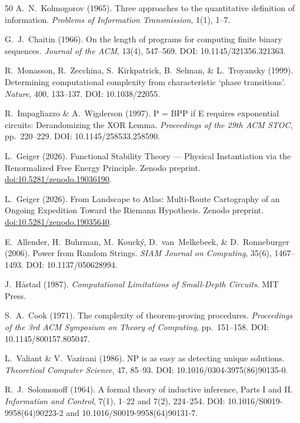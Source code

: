 \documentclass[aps,prd,twocolumn,superscriptaddress,nofootinbib]{revtex4-2}
\theoremstyle{definition}
\theoremstyle{remark}
\begin{document}
\begin{thebibliography}{50}
A.~N.~Kolmogorov (1965).
Three approaches to the quantitative definition of information.
\textit{Problems of Information Transmission}, 1(1), 1--7.

G.~J.~Chaitin (1966).
On the length of programs for computing finite binary sequences.
\textit{Journal of the ACM}, 13(4), 547--569.
DOI: 10.1145/321356.321363.

R.~Monasson, R.~Zecchina, S.~Kirkpatrick, B.~Selman, \& L.~Troyansky (1999).
Determining computational complexity from characteristic `phase transitions'.
\textit{Nature}, 400, 133--137.
DOI: 10.1038/22055.

R.~Impagliazzo \& A.~Wigderson (1997).
P = BPP if E requires exponential circuits: Derandomizing the XOR Lemma.
\textit{Proceedings of the 29th ACM STOC}, pp.\ 220--229.
DOI: 10.1145/258533.258590.

L.~Geiger (2026).
Functional Stability Theory --- Physical Instantiation via the Renormalized Free Energy Principle.
Zenodo preprint.
\href{https://doi.org/10.5281/zenodo.19036190}{doi:10.5281/zenodo.19036190}.

L.~Geiger (2026).
From Landscape to Atlas: Multi-Route Cartography of an Ongoing Expedition Toward the Riemann Hypothesis.
Zenodo preprint.
\href{https://doi.org/10.5281/zenodo.19035640}{doi:10.5281/zenodo.19035640}.

E.~Allender, H.~Buhrman, M.~Kouck\'y, D.~van~Melkebeek, \& D.~Ronneburger (2006).
Power from Random Strings.
\textit{SIAM Journal on Computing}, 35(6), 1467--1493.
DOI: 10.1137/050628994.

J.~H\r{a}stad (1987).
\textit{Computational Limitations of Small-Depth Circuits}.
MIT Press.

S.~A.~Cook (1971).
The complexity of theorem-proving procedures.
\textit{Proceedings of the 3rd ACM Symposium on Theory of Computing}, pp.\ 151--158.
DOI: 10.1145/800157.805047.

L.~Valiant \& V.~Vazirani (1986).
NP is as easy as detecting unique solutions.
\textit{Theoretical Computer Science}, 47, 85--93.
DOI: 10.1016/0304-3975(86)90135-0.

R.~J.~Solomonoff (1964).
A formal theory of inductive inference, Parts I and II.
\textit{Information and Control}, 7(1), 1--22 and 7(2), 224--254.
DOI: 10.1016/S0019-9958(64)90223-2 and 10.1016/S0019-9958(64)90131-7.


\end{thebibliography}
\end{document}
